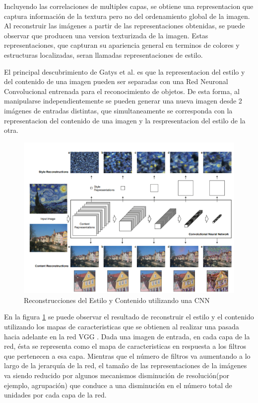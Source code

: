 \documentclass[a4paper,11pt,spanish]{book}
\begin{document}
      Incluyendo las correlaciones de multiples capas, se obtiene una representacion que captura información de la textura pero no del ordenamiento global de la imagen.
      Al reconstruir las imágenes a partir de las representaciones obtenidas, se puede observar que producen una version texturizada de la imagen.
      Estas representaciones, que capturan su apariencia general en terminos de colores y estructuras localizadas, seran llamadas representaciones de estilo.
      
      El principal descubrimiento de Gatys et al. es que la representacion del estilo y del contenido de una imagen pueden ser separadas con una Red Neuronal Convolucional entrenada
      para el reconocimiento de objetos. De esta forma, al manipularse independientemente se pueden generar una nueva imagen desde 2 imágenes de entradas distintas, que 
      simultaneamente se corresponda con la representacion del contenido de una imagen y la respresentacion del estilo de la otra.
      
      \begin{figure}[h]
	\includegraphics[width=\textwidth]{./img/gatys_1.png}
	\caption{Reconstrucciones del Estilo y Contenido utilizando una CNN}
	\label{fig:gatys_reconstrucciones}
      \end{figure}
	  
      En la figura \ref{fig:gatys_reconstrucciones} se puede observar el resultado de reconstruir el estilo y el contenido utilizando los mapas de caracteristicas que se obtienen al
      realizar una pasada hacia adelante en la red VGG \cite{SimonyanVGG}. Dada una imagen de entrada, en cada capa de la red, ésta se representa como el mapa de caracteristicas en respuesta a los filtros
      que pertenecen a esa capa. Mientras que el número de filtros va aumentando a lo largo de la jerarquía de la red, el tamaño de las representaciones de la imágenes va siendo reducido 
      por algunos mecanismos disminución de resolución(por ejemplo, agrupación) que conduce a una disminución en el número total de unidades por cada capa de la red.
      
\end{document}
